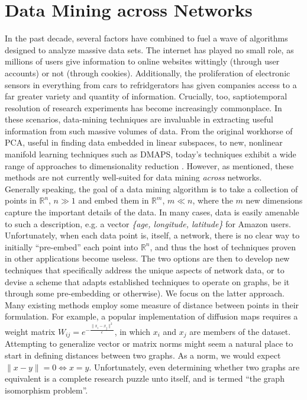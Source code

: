 \documentclass[11pt]{article}
\begin{document}
\section{Data Mining across Networks}
\indent In the past decade, several factors have combined to fuel a wave of algorithms designed to analyze massive data sets. The internet has played no small role, as millions of users give information to online websites wittingly (through user accounts) or not (through cookies). Additionally, the proliferation of electronic sensors in everything from cars to refridgerators has given companies access to a far greater variety and quantity of information. Crucially, too, saptiotemporal resolution of research experiments has become increasingly commonplace. In these scenarios, data-mining techniques are invaluable in extracting useful information from such massive volumes of data. From the original workhorse of PCA, useful in finding data embedded in linear subspaces, to new, nonlinear manifold learning techniques such as DMAPS, today's techniques exhibit a wide range of approaches to dimensionality reduction \cite{data mining papers}. However, as mentioned, these methods are not currently well-suited for data mining \textit{across} networks. \vspace{1mm}\\ 
\indent Generally speaking, the goal of a data mining algorithm is to take a collection of points in $\mathbb{R}^{n}$, $n\gg1$ and embed them in $\mathbb{R}^{m}$, $m \ll n$, where the $m$ new dimensions capture the important details of the data. In many cases, data is easily amenable to such a description, e.g. a vector \textit{\{age, longitude, latitude\}} for Amazon users. Unfortunately, when each data point is, itself, a network, there is no clear way to initially ``pre-embed'' each point into $\mathbb{R}^{n}$, and thus the host of techniques proven in other applications become useless. The two options are then to develop new techniques that specifically address the unique aspects of network data, or to devise a scheme that adapts established techniques to operate on graphs, be it through some pre-embedding or otherwise). We focus on the latter approach. \vspace{1mm}\\
\indent Many existing methods employ some measure of distance between points in their formulation. For example, a popular implementation of diffusion maps requires a weight matrix $W_{ij}=e^{-\frac{\|x_{i}-x_{j}\|^{2}}{\epsilon}}$, in which $x_{i}$ and $x_{j}$ are members of the dataset. Attempting to generalize vector or matrix norms might seem a natural place to start in defining distances between two graphs. As a norm, we would expect $\| x - y \| = 0 \Leftrightarrow x = y$. Unfortunately, even determining whether two graphs are equivalent is a complete research puzzle unto itself, and is termed ``the graph isomorphism problem''.
\end{document}
